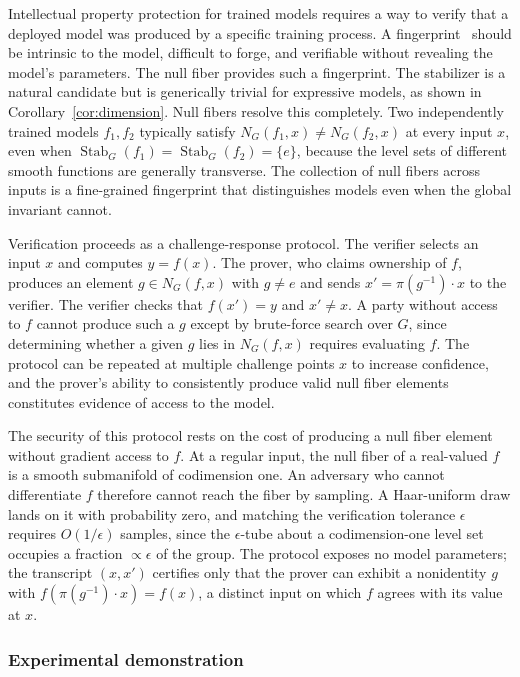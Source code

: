 \documentclass[11pt]{article}
\DeclareMathOperator{\Stab}{Stab}
\begin{document}
Intellectual property protection for trained models requires a way to verify that a deployed model was produced by a specific training process. A fingerprint~\cite{cao2021ipguard,lukas2019deep,peng2022fingerprinting,regazzoni2021protecting} should be intrinsic to the model, difficult to forge, and verifiable without revealing the model's parameters. The null fiber provides such a fingerprint. The stabilizer is a natural candidate but is generically trivial for expressive models, as shown in Corollary~\ref{cor:dimension}. Null fibers resolve this completely. Two independently trained models $f_1, f_2$ typically satisfy $N_G(f_1, x) \neq N_G(f_2, x)$ at every input $x$, even when $\Stab_G(f_1) = \Stab_G(f_2) = \{e\}$, because the level sets of different smooth functions are generally transverse. The collection of null fibers across inputs is a fine-grained fingerprint that distinguishes models even when the global invariant cannot.

Verification proceeds as a challenge-response protocol. The verifier selects an input $x$ and computes $y = f(x)$. The prover, who claims ownership of $f$, produces an element $g \in N_G(f, x)$ with $g \neq e$ and sends $x' = \pi(g^{-1}) \cdot x$ to the verifier. The verifier checks that $f(x') = y$ and $x' \neq x$. A party without access to $f$ cannot produce such a $g$ except by brute-force search over $G$, since determining whether a given $g$ lies in $N_G(f, x)$ requires evaluating $f$. The protocol can be repeated at multiple challenge points $x$ to increase confidence, and the prover's ability to consistently produce valid null fiber elements constitutes evidence of access to the model.

The security of this protocol rests on the cost of producing a null fiber element without gradient access to $f$. At a regular input, the null fiber of a real-valued $f$ is a smooth submanifold of codimension one. An adversary who cannot differentiate $f$ therefore cannot reach the fiber by sampling. A Haar-uniform draw lands on it with probability zero, and matching the verification tolerance $\epsilon$ requires $O(1/\epsilon)$ samples, since the $\epsilon$-tube about a codimension-one level set occupies a fraction $\propto \epsilon$ of the group. The protocol exposes no model parameters; the transcript $(x, x')$ certifies only that the prover can exhibit a nonidentity $g$ with $f(\pi(g^{-1}) \cdot x) = f(x)$, a distinct input on which $f$ agrees with its value at $x$.

\subsubsection{Experimental demonstration}\label{sec:fingerprinting-experiments}
\end{document}
